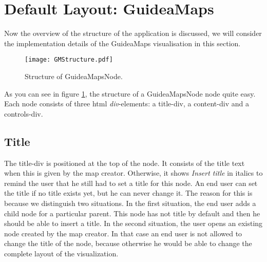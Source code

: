 \section{Default Layout: GuideaMaps}
Now the overview of the structure of the application is discussed, we will consider the implementation details of the GuideaMaps visualisation in this section.
\begin{figure}[H]
	\centering
	\texttt{[image: GMStructure.pdf]}
	\caption{Structure of GuideaMapsNode.}
	\label{fig:gmnodestructure}
\end{figure}

As you can see in figure \ref{fig:gmnodestructure}, the structure of a GuideaMapsNode node quite easy. Each node consists of three html \textit{div}-elements: a title-div, a content-div and a controls-div.

\subsection{Title}
The title-div is positioned at the top of the node. It consists of the title text when this is given by the map creator. Otherwise, it shows \textit{Insert title} in italics to remind the user that he still had to set a title for this node. An end user can set the title if no title exists yet, but he can never change it. The reason for this is because we distinguish two situations. In the first situation, the end user adds a child node for a particular parent. This node has not title by default and then he should be able to insert a title. In the second situation, the user opens an existing node created by the map creator. In that case an end user is not allowed to change the title of the node, because otherwise he would be able to change the complete layout of the visualization. \\

